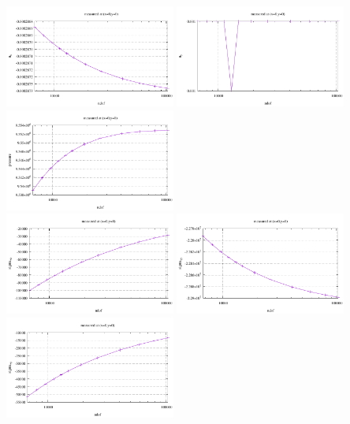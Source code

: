 \begin{center}
\includegraphics[width=5.6cm]{python_codes/fieldstone_124/results/exp1/corner_ux}
\includegraphics[width=5.6cm]{python_codes/fieldstone_124/results/exp1/corner_uy}
\includegraphics[width=5.6cm]{python_codes/fieldstone_124/results/exp1/corner_p}\\
\includegraphics[width=5.6cm]{python_codes/fieldstone_124/results/exp1/corner_sigmaxx}
\includegraphics[width=5.6cm]{python_codes/fieldstone_124/results/exp1/corner_sigmayy}
\includegraphics[width=5.6cm]{python_codes/fieldstone_124/results/exp1/corner_sigmaxy}\\

\end{center}
